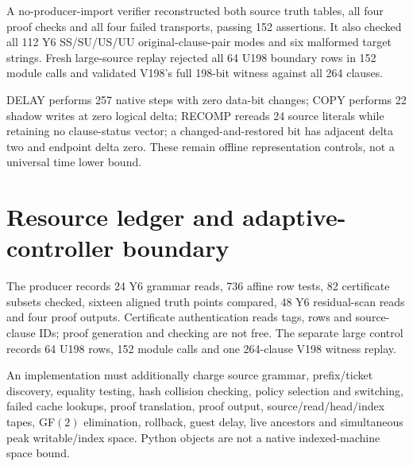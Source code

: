 \documentclass[11pt]{article}
\begin{document}
A no-producer-import verifier reconstructed both source truth tables, all four proof checks and all four failed transports, passing 152 assertions.  It also checked all 112 Y6 SS/SU/US/UU original-clause-pair modes and six malformed target strings.  Fresh large-source replay rejected all 64 U198 boundary rows in 152 module calls and validated V198's full 198-bit witness against all 264 clauses.

DELAY performs 257 native steps with zero data-bit changes; COPY performs 22 shadow writes at zero logical delta; RECOMP rereads 24 source literals while retaining no clause-status vector; a changed-and-restored bit has adjacent delta two and endpoint delta zero.  These remain offline representation controls, not a universal time lower bound.

\section{Resource ledger and adaptive-controller boundary}
The producer records 24 Y6 grammar reads, 736 affine row tests, 82 certificate subsets checked, sixteen aligned truth points compared, 48 Y6 residual-scan reads and four proof outputs.  Certificate authentication reads tags, rows and source-clause IDs; proof generation and checking are not free.  The separate large control records 64 U198 rows, 152 module calls and one 264-clause V198 witness replay.

An implementation must additionally charge source grammar, prefix/ticket discovery, equality testing, hash collision checking, policy selection and switching, failed cache lookups, proof translation, proof output, source/read/head/index tapes, GF$(2)$ elimination, rollback, guest delay, live ancestors and simultaneous peak writable/index space.  Python objects are not a native indexed-machine space bound.
\end{document}

